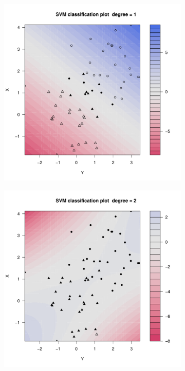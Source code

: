 \begin{figure}[H]
	\centering
	\begin{subfigure}{0.24\linewidth}
		\includegraphics[width=1\linewidth]{Graphics/Problema_01/Experiment_02_1.pdf}
		\caption{}
	\end{subfigure}
	\begin{subfigure}{0.24\linewidth}
		\includegraphics[width=1\linewidth]{Graphics/Problema_01/Experiment_02_2.pdf}

\end{subfigure}
\end{figure}
